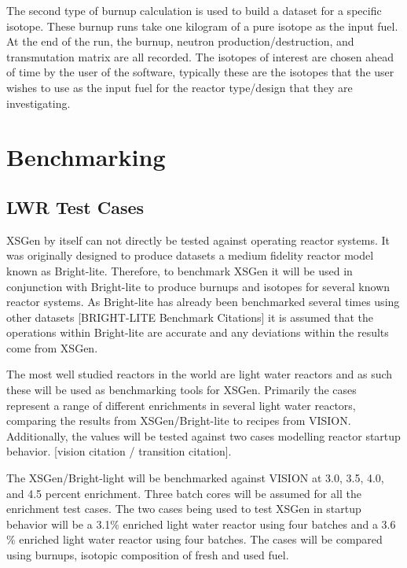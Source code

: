 \documentclass{article}
\begin{document}
The second type of burnup calculation is used to build a dataset for a specific isotope. These burnup runs take one kilogram of a pure isotope as the input fuel. At the end of the run, the burnup, neutron production/destruction, and transmutation matrix are all recorded. The isotopes of interest are chosen ahead of time by the user of the software, typically these are the isotopes that the user wishes to use as the input fuel for the reactor type/design that they are investigating. 

\section{Benchmarking}
\subsection{LWR Test Cases}
XSGen by itself can not directly be tested against operating reactor systems. It was originally designed to produce datasets a medium fidelity reactor model known as Bright-lite. Therefore, to benchmark XSGen it will be used in conjunction with Bright-lite to produce burnups and isotopes for several known reactor systems.  As Bright-lite has already been benchmarked several times using other datasets [BRIGHT-LITE Benchmark Citations] it is assumed that the operations within Bright-lite are accurate and any deviations within the results come from XSGen. 

The most well studied reactors in the world are light water reactors and as such these will be used as benchmarking tools for XSGen. Primarily the cases represent a range of different enrichments in several light water reactors, comparing the results from XSGen/Bright-lite to recipes from VISION. Additionally, the values will be tested against two cases modelling reactor startup behavior.  [vision citation / transition citation].

The XSGen/Bright-light will be benchmarked against VISION at 3.0, 3.5, 4.0, and 4.5 percent enrichment. Three batch cores will be assumed for all the enrichment test cases. 
The two cases being used to test XSGen in startup behavior will be a 3.1$\%$ enriched light water reactor using four batches and a 3.6$\%$ enriched light water reactor using four batches. The cases will be compared using burnups, isotopic composition of fresh and used fuel.
\end{document}
